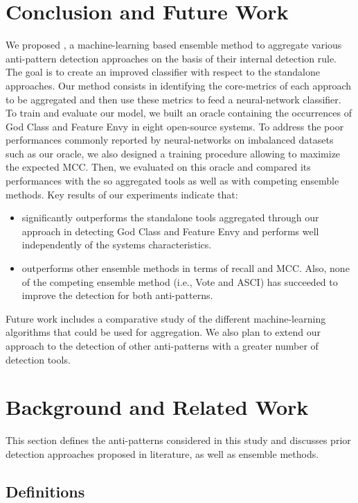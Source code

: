 \section{Conclusion and Future Work}
\label{section: conclusion}

We proposed \NAME{}, a machine-learning based ensemble method to aggregate various anti-pattern detection approaches on the basis of their internal detection rule. The goal is to create an improved classifier with respect to the standalone approaches. Our method consists in identifying the core-metrics of each approach to be aggregated and then use these metrics to feed a neural-network classifier. To train and evaluate our model, we built an oracle containing the occurrences of God Class and Feature Envy in eight open-source systems. To address the poor performances commonly reported by neural-networks on imbalanced datasets such as our oracle, we also designed a training procedure allowing to maximize the expected MCC. Then, we evaluated \NAME{} on this oracle and compared its performances with the so aggregated tools as well as with competing ensemble methods. Key results of our experiments indicate that:

\begin{itemize}
\item \NAME{} significantly outperforms the standalone tools aggregated through our approach in detecting God Class and Feature Envy and performs well independently of the systems characteristics.

\item \NAME{} outperforms other ensemble methods in terms of recall and MCC. Also, none of the competing ensemble method (i.e., Vote and ASCI) has succeeded to improve the detection for both anti-patterns.
\end{itemize}

Future work includes a comparative study of the different machine-learning algorithms that could be used for aggregation. We also plan to extend our approach to the detection of other anti-patterns with a greater number of detection tools.
\section{Background and Related Work}
\label{section: related work}
This section defines the anti-patterns considered in this study and discusses prior detection approaches proposed in literature, as well as ensemble methods.
\subsection{Definitions}
